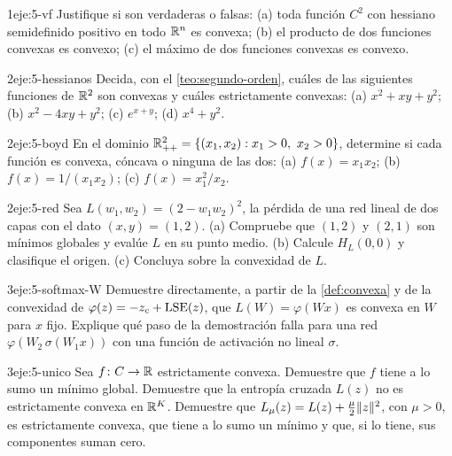 \begin{ejercicio}{1}{eje:5-vf}
Justifique si son verdaderas o falsas: (a) toda función $C^{2}$ con hessiano semidefinido positivo en todo $\mathbb{R}^{n}$ es convexa; (b) el producto de dos funciones convexas es convexo; (c) el máximo de dos funciones convexas es convexo.
\end{ejercicio}

\begin{ejercicio}{2}{eje:5-hessianos}
Decida, con el \cref{teo:segundo-orden}, cuáles de las siguientes funciones de $\mathbb{R}^{2}$ son convexas y cuáles estrictamente convexas: (a) $x^{2}+xy+y^{2}$; (b) $x^{2}-4xy+y^{2}$; (c) $e^{x+y}$; (d) $x^{4}+y^{2}$.
\end{ejercicio}

\begin{ejercicio}{2}{eje:5-boyd}
En el dominio $\R^{2}_{++}=\{(x_1,x_2):x_1>0,\ x_2>0\}$, determine si cada función es convexa, cóncava o ninguna de las dos: (a) $f(x)=x_1x_2$; (b) $f(x)=1/(x_1x_2)$; (c) $f(x)=x_1^{2}/x_2$.
\end{ejercicio}

\begin{ejercicio}{2}{eje:5-red}
Sea $L(w_1,w_2)=(2-w_1w_2)^{2}$, la pérdida de una red lineal de dos capas con el dato $(x,y)=(1,2)$. (a) Compruebe que $(1,2)$ y $(2,1)$ son mínimos globales y evalúe $L$ en su punto medio. (b) Calcule $H_L(0,0)$ y clasifique el origen. (c) Concluya sobre la convexidad de $L$.
\end{ejercicio}

\begin{ejercicio}{3}{eje:5-softmax-W}
Demuestre directamente, a partir de la \cref{def:convexa} y de la convexidad de $\varphi(z)=-z_c+\operatorname{LSE}(z)$, que $L(W)=\varphi(Wx)$ es convexa en $W$ para $x$ fijo. Explique qué paso de la demostración falla para una red $\varphi(W_2\,\sigma(W_1x))$ con una función de activación no lineal $\sigma$.
\end{ejercicio}

\begin{ejercicio}{3}{eje:5-unico}
Sea $f\colon C\to\mathbb{R}$ estrictamente convexa. Demuestre que $f$ tiene a lo sumo un mínimo global. Demuestre que la entropía cruzada $L(z)$ no es estrictamente convexa en $\mathbb{R}^{K}$. Demuestre que $L_\mu(z)=L(z)+\tfrac{\mu}{2}\lVert z\rVert^{2}$, con $\mu>0$, es estrictamente convexa, que tiene a lo sumo un mínimo y que, si lo tiene, sus componentes suman cero.
\end{ejercicio}

